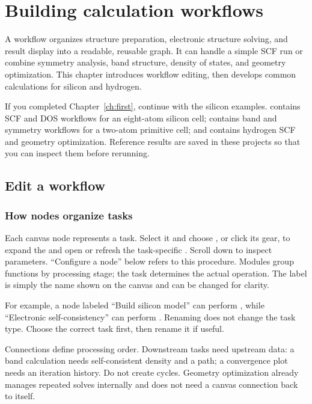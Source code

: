 \chapter{Building calculation workflows}\label{ch:workflows}

A workflow organizes structure preparation, electronic structure solving, and result display into a readable, reusable graph. It can handle a simple SCF run or combine symmetry analysis, band structure, density of states, and geometry optimization. This chapter introduces workflow editing, then develops common calculations for silicon and hydrogen.

If you completed Chapter~\ref{ch:first}, continue with the silicon examples.  contains SCF and DOS workflows for an eight-atom silicon cell;  contains band and symmetry workflows for a two-atom primitive cell; and  contains hydrogen SCF and geometry optimization. Reference results are saved in these projects so that you can inspect them before rerunning.

\section{Edit a workflow}

\subsection{How nodes organize tasks}

Each canvas node represents a task. Select it and choose , or click its gear, to expand the  and open or refresh the task-specific . Scroll down to inspect parameters. ``Configure a node'' below refers to this procedure. Modules group functions by processing stage; the task determines the actual operation. The label is simply the name shown on the canvas and can be changed for clarity.

For example, a node labeled ``Build silicon model'' can perform , while ``Electronic self-consistency'' can perform . Renaming does not change the task type. Choose the correct task first, then rename it if useful.

Connections define processing order. Downstream tasks need upstream data: a band calculation needs self-consistent density and a path; a convergence plot needs an iteration history. Do not create cycles. Geometry optimization already manages repeated solves internally and does not need a canvas connection back to itself.

